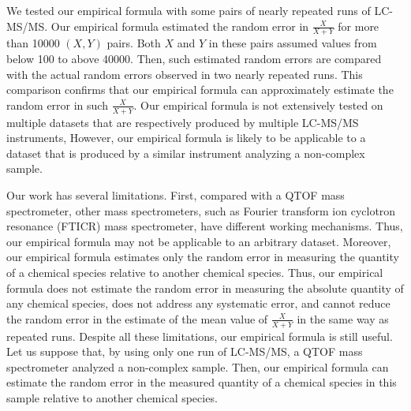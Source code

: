 We tested our empirical formula with some pairs of nearly repeated runs of \gls{LC-MS/MS}. %
Our empirical formula estimated the random error in \(\frac{X}{X+Y}\) for more than 10000 \((X,Y)\) pairs.
Both \(X\) and \(Y\) in these pairs assumed values from below 100 to above 40000. %
Then, such estimated random errors are compared with the actual random errors observed in two nearly repeated runs.
This comparison confirms that our empirical formula can approximately estimate the random error in such \(\frac{X}{X+Y}\).
Our empirical formula is not extensively tested on multiple datasets that are respectively produced by multiple \gls{LC-MS/MS} instruments,
However, our empirical formula is likely to be applicable to a dataset that is produced by a similar instrument analyzing a non-complex sample.
		
Our work has several limitations. 
First, 
	compared with a \gls{QTOF} mass spectrometer,
	other mass spectrometers, such as Fourier transform ion cyclotron resonance (FTICR) mass spectrometer, have different working mechanisms.
Thus, our empirical formula may not be applicable to an arbitrary dataset. 
Moreover,
	our empirical formula estimates only the random error in measuring the quantity of a chemical species relative to another chemical species.{}
Thus,
	our empirical formula does not estimate the random error in measuring the absolute quantity of any chemical species,
	does not address any systematic error,
	and cannot reduce the random error in the estimate of the mean value of \(\frac{X}{X+Y}\) in the same way as repeated runs.
Despite all these limitations, our empirical formula is still useful.
Let us suppose that, by using only one run of \gls{LC-MS/MS}, a \gls{QTOF} mass spectrometer analyzed a non-complex sample.
Then, our empirical formula can estimate the random error in the measured quantity of a chemical species in this sample relative to another chemical species.
		